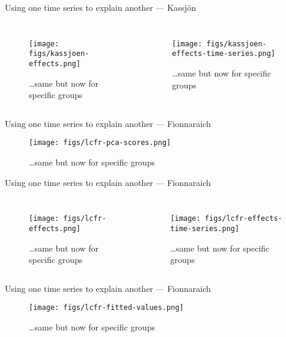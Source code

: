 \documentclass[11pt,ignorenonframetext,compress, aspectratio=169]{beamer}
\newcommand{\columnsbegin}{\begin{columns}}
\newcommand{\columnsend}{\end{columns}}
\begin{document}
\begin{frame}{Using one time series to explain another --- Kassjön}

\columnsbegin
{}

\begin{figure}[htbp]
\centering
\texttt{[image: figs/kassjoen-effects.png]}
\caption{\ldots{}same but now for specific groups}
\end{figure}


\begin{figure}[htbp]
\centering
\texttt{[image: figs/kassjoen-effects-time-series.png]}
\caption{\ldots{}same but now for specific groups}
\end{figure}

\columnsend

\end{frame}

\begin{frame}{Using one time series to explain another --- Fionnaraich}

\begin{figure}[htbp]
\centering
\texttt{[image: figs/lcfr-pca-scores.png]}
\caption{\ldots{}same but now for specific groups}
\end{figure}

\end{frame}

\begin{frame}{Using one time series to explain another --- Fionnaraich}

\columnsbegin
{}

\begin{figure}[htbp]
\centering
\texttt{[image: figs/lcfr-effects.png]}
\caption{\ldots{}same but now for specific groups}
\end{figure}


\begin{figure}[htbp]
\centering
\texttt{[image: figs/lcfr-effects-time-series.png]}
\caption{\ldots{}same but now for specific groups}
\end{figure}

\columnsend

\end{frame}

\begin{frame}{Using one time series to explain another --- Fionnaraich}

\begin{figure}[htbp]
\centering
\texttt{[image: figs/lcfr-fitted-values.png]}
\caption{\ldots{}same but now for specific groups}
\end{figure}

\end{frame}
\end{document}
